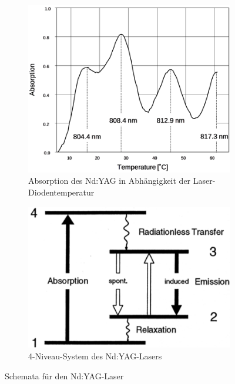 \documentclass[numbers=noenddot,12pt,a4paper]{scrartcl}
\begin{document}
\begin{figure}[H]
	\centering
	\begin{subfigure}[htbp]{0.49\textwidth}
	\includegraphics[width=\textwidth]{yes.png}
	\caption{Absorption des Nd:YAG in Abhängigkeit der Laser-Diodentemperatur}\label{img:yes}
	\end{subfigure}
\begin{subfigure}[htbp]{0.49\textwidth}
	\vspace{-0.3cm}
	\includegraphics[width=\textwidth]{vierniveau.png}
	\vspace{0.3cm}
	\caption{4-Niveau-System des Nd:YAG-Lasers}\label{img:4niv}
\end{subfigure}
\caption{Schemata für den Nd:YAG-Laser}
\end{figure}
\pagebreak
\end{document}
